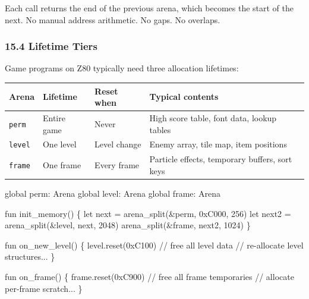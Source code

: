 \documentclass[
  11pt,
]{article}
\newenvironment{Shaded}{}{}
\newcommand{\NormalTok}[1]{#1}
\begin{document}
Each call returns the end of the previous arena, which becomes the start
of the next. No manual address arithmetic. No gaps. No overlaps.

\subsubsection{15.4 Lifetime Tiers}\label{lifetime-tiers}

Game programs on Z80 typically need three allocation lifetimes:

\begin{longtable}[]{@{}
  >{\raggedright\arraybackslash}p{}
  >{\raggedright\arraybackslash}p{}
  >{\raggedright\arraybackslash}p{}
  >{\raggedright\arraybackslash}p{}@{}}
\toprule\noalign{}
\begin{minipage}[b]{\linewidth}\raggedright
Arena
\end{minipage} & \begin{minipage}[b]{\linewidth}\raggedright
Lifetime
\end{minipage} & \begin{minipage}[b]{\linewidth}\raggedright
Reset when
\end{minipage} & \begin{minipage}[b]{\linewidth}\raggedright
Typical contents
\end{minipage} \\
\midrule\noalign{}
\endhead
\bottomrule\noalign{}
\endlastfoot
\texttt{perm} & Entire game & Never & High score table, font data,
lookup tables \\
\texttt{level} & One level & Level change & Enemy array, tile map, item
positions \\
\texttt{frame} & One frame & Every frame & Particle effects, temporary
buffers, sort keys \\
\end{longtable}

\begin{Shaded}
\begin{Highlighting}[]
\NormalTok{global perm: Arena}
\NormalTok{global level: Arena}
\NormalTok{global frame: Arena}

\NormalTok{fun init\_memory() \{}
\NormalTok{    let next = arena\_split(\&perm, 0xC000, 256)}
\NormalTok{    let next2 = arena\_split(\&level, next, 2048)}
\NormalTok{    arena\_split(\&frame, next2, 1024)}
\NormalTok{\}}

\NormalTok{fun on\_new\_level() \{}
\NormalTok{    level.reset(0xC100)    // free all level data}
\NormalTok{    // re{-}allocate level structures...}
\NormalTok{\}}

\NormalTok{fun on\_frame() \{}
\NormalTok{    frame.reset(0xC900)    // free all frame temporaries}
\NormalTok{    // allocate per{-}frame scratch...}
\NormalTok{\}}
\end{Highlighting}
\end{Shaded}
\end{document}
